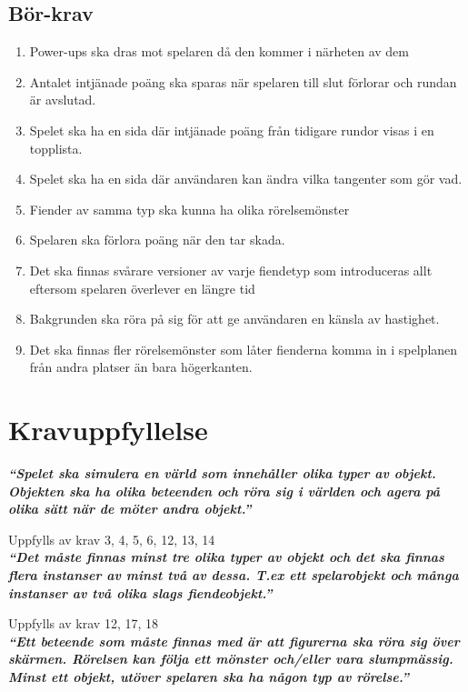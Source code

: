 \documentclass{TDP005mall}
\begin{document}
\subsection{Bör-krav}
\begin{enumerate}
\item Power-ups ska dras mot spelaren då den kommer i närheten av dem
\item Antalet intjänade poäng ska sparas när spelaren till slut förlorar och rundan är avslutad.
\item Spelet ska ha en sida där intjänade poäng från tidigare rundor visas i en topplista.
\item Spelet ska ha en sida där användaren kan ändra vilka tangenter som gör vad.
\item Fiender av samma typ ska kunna ha olika rörelsemönster
\item Spelaren ska förlora poäng när den tar skada. %
\item Det ska finnas svårare versioner av varje fiendetyp som introduceras allt eftersom spelaren överlever en längre tid
\item Bakgrunden ska röra på sig för att ge användaren en känsla av hastighet.
\item Det ska finnas fler rörelsemönster som låter fienderna komma in i spelplanen från andra platser än bara högerkanten.

\end{enumerate}

\section{Kravuppfyllelse}
\textit{\textbf{``Spelet ska simulera en värld som innehåller olika typer av objekt. Objekten ska ha olika beteenden och röra sig i världen och agera på olika sätt när de möter andra objekt.''}}


Uppfylls av krav 3, 4, 5, 6, 12, 13, 14\\


\textit{\textbf{``Det måste finnas minst tre olika typer av objekt och det ska finnas flera instanser av minst två av dessa. T.ex ett spelarobjekt och många instanser av två olika slags fiendeobjekt.''}}


Uppfylls av krav 12, 17, 18\\

\textit{\textbf{``Ett beteende som måste finnas med är att figurerna ska röra sig över skärmen. Rörelsen kan följa ett mönster och/eller vara slumpmässig. Minst ett objekt, utöver spelaren ska ha någon typ av rörelse.''}}
\end{document}

